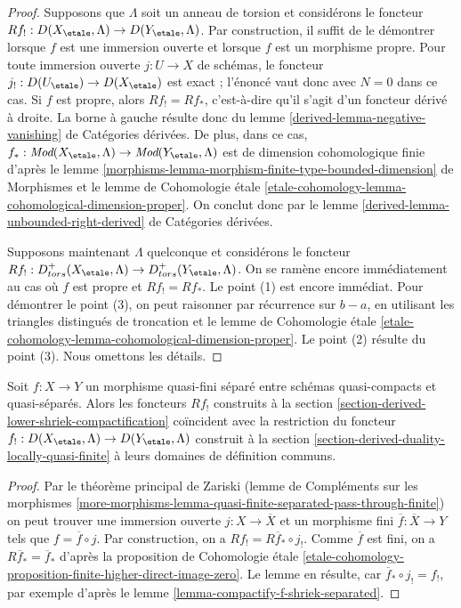 \begin{proof}
Supposons que $\Lambda$ soit un anneau de torsion et considérons le foncteur
$Rf_! : D(X_\etale, \Lambda) \to D(Y_\etale, \Lambda)$.
Par construction, il suffit de le démontrer lorsque $f$ est une immersion ouverte
et lorsque $f$ est un morphisme propre. Pour toute immersion ouverte $j : U \to X$
de schémas, le foncteur $j_! : D(U_\etale) \to D(X_\etale)$ est exact ;
l'énoncé vaut donc avec $N = 0$ dans ce cas.
Si $f$ est propre, alors $Rf_! = Rf_*$, c'est-à-dire qu'il s'agit d'un foncteur
dérivé à droite. La borne à gauche résulte donc du
lemme \ref{derived-lemma-negative-vanishing} de Catégories dérivées.
De plus, dans ce cas, $f_* : \textit{Mod}(X_\etale, \Lambda)
\to \textit{Mod}(Y_\etale, \Lambda)$ est de dimension cohomologique finie d'après le
lemme \ref{morphisms-lemma-morphism-finite-type-bounded-dimension} de Morphismes
et le lemme de Cohomologie étale
\ref{etale-cohomology-lemma-cohomological-dimension-proper}.
On conclut donc par le
lemme \ref{derived-lemma-unbounded-right-derived} de Catégories dérivées.

\medskip\noindent
Supposons maintenant $\Lambda$ quelconque et considérons le foncteur
$Rf_! : D^+_{tors}(X_\etale, \Lambda) \to D^+_{tors}(Y_\etale, \Lambda)$.
On se ramène encore immédiatement au cas où $f$ est propre et
$Rf_! = Rf_*$. Le point (1) est encore immédiat. Pour démontrer le point (3),
on peut raisonner par récurrence sur $b - a$, en utilisant les triangles distingués
de troncation et le lemme de Cohomologie étale
\ref{etale-cohomology-lemma-cohomological-dimension-proper}.
Le point (2) résulte du point (3). Nous omettons les détails.
\end{proof}

\begin{lemma}
\label{lemma-Rf-shriek-for-quasi-finite}
Soit $f : X \to Y$ un morphisme quasi-fini séparé entre schémas quasi-compacts et
quasi-séparés. Alors les foncteurs $Rf_!$ construits à la
section \ref{section-derived-lower-shriek-compactification}
coïncident avec la restriction du foncteur
$f_! : D(X_\etale, \Lambda) \to D(Y_\etale, \Lambda)$
construit à la section \ref{section-derived-duality-locally-quasi-finite}
à leurs domaines de définition communs.
\end{lemma}

\begin{proof}
Par le théorème principal de Zariski (lemme de Compléments sur les morphismes
\ref{more-morphisms-lemma-quasi-finite-separated-pass-through-finite})
on peut trouver une immersion ouverte $j : X \to \overline{X}$ et un morphisme fini
$\overline{f} : \overline{X} \to Y$ tels que $f = \overline{f} \circ j$.
Par construction, on a $Rf_! = R\overline{f}_* \circ j_!$.
Comme $\overline{f}$ est fini, on a $R\overline{f}_* = \overline{f}_*$
d'après la proposition de Cohomologie étale
\ref{etale-cohomology-proposition-finite-higher-direct-image-zero}.
Le lemme en résulte, car $\overline{f}_* \circ j_! = f_!$,
par exemple d'après le lemme \ref{lemma-compactify-f-shriek-separated}.
\end{proof}

